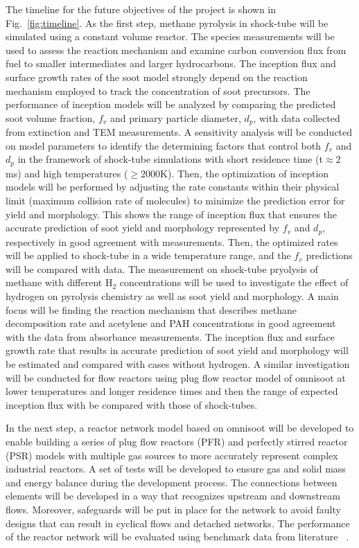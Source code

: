   
The timeline for the future objectives of the project is shown in Fig.~\ref{fig:timeline}. As the first step, methane pyrolysis in shock-tube will be simulated using a constant volume reactor. The species measurements will be used to assess the reaction mechanism and examine carbon conversion flux from fuel to smaller intermediates and larger hydrocarbons. The inception flux and surface growth rates of the soot model strongly depend on the reaction mechanism employed to track the concentration of soot precursors. The performance of inception models will be analyzed by comparing the predicted soot volume fraction, $f_v$ and primary particle diameter, $d_p$, with data collected from extinction and TEM measurements. A sensitivity analysis will be conducted on model parameters to identify the determining factors that control both $f_v$ and $d_p$ in the framework of shock-tube simulations with short residence time (t$\approx2$ ms) and high temperatures ($\ge 2000$K). Then, the optimization of inception models will be performed by adjusting the rate constants within their physical limit (maximum collision rate of molecules) to minimize the prediction error for yield and morphology. This shows the range of inception flux that ensures the accurate prediction of soot yield and morphology represented by $f_v$ and $d_p$, respectively in good agreement with measurements. Then, the optimized rates will be applied to shock-tube in a wide temperature range, and the $f_v$ predictions will be compared with data. The measurement on shock-tube pryolysis of methane with different $\mathrm{H_2}$ concentrations will be used to investigate the effect of hydrogen on pyrolysis chemistry as well as soot yield and morphology. A main focus will be finding the reaction mechanism that describes methane decomposition rate and acetylene and PAH concentrations in good agreement with the data from absorbance measurements. The inception flux and surface growth rate that results in accurate prediction of soot yield and morphology will be estimated and compared with cases without hydrogen. A similar investigation will be conducted for flow reactors using plug flow reactor model of omnisoot at lower temperatures and longer residence times and then the range of expected inception flux with be compared with those of shock-tubes.

In the next step, a reactor network model based on omnisoot will be developed to enable building a series of  plug flow reactors (PFR) and  perfectly stirred reactor (PSR) models with multiple gas sources to more accurately represent complex industrial reactors. A set of tests will be developed to ensure gas and solid mass and energy balance during the development process. The connections between elements will be developed in a way that recognizes upstream and downstream flows. Moreover, safeguards will be put in place for the network to avoid faulty designs that can result in cyclical flows and detached networks. The performance of the reactor network will be evaluated using benchmark data from literature ~\citep{manzello2007soot}. 

